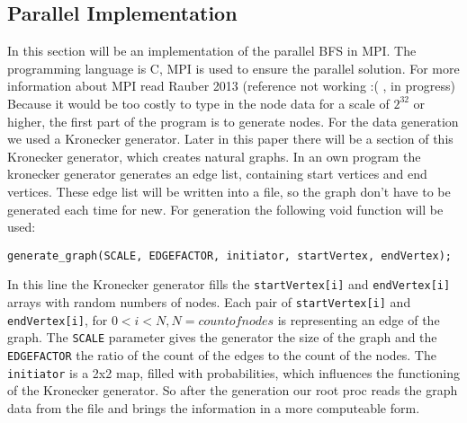 \documentclass[12pt,a4paper]{article}
\begin{document}
\subsection{Parallel Implementation}
\label{sec:parallel-impl}

In this section will be an implementation of the parallel BFS in MPI. The programming language is C, MPI is used to ensure the parallel solution. For more information about MPI read Rauber 2013 (reference not working :( , in progress)\\
Because it would be too costly to type in the node data for a scale of \(2^{32}\) or higher, the first part of the program is to generate nodes. For the data generation we used a Kronecker generator. Later in this paper there will be a section of this Kronecker generator, which creates natural graphs. In an own program the kronecker generator generates an edge list, containing start vertices and end vertices. These edge list will be written into a file, so the graph don't have to be generated each time for new. For generation the following void function will be used:

\begin{lstlisting}
generate_graph(SCALE, EDGEFACTOR, initiator, startVertex, endVertex);
\end{lstlisting}

In this line the Kronecker generator fills the \lstinline{startVertex[i]} and \lstinline{endVertex[i]} arrays with random numbers of nodes. Each pair of \lstinline{startVertex[i]} and \lstinline{endVertex[i]}, for \( 0 < i < N, N = count of nodes \) is representing an edge of the graph. The \lstinline{SCALE} parameter gives the generator the size of the graph and the \lstinline{EDGEFACTOR} the ratio of the count of the edges to the count of the nodes. The \lstinline{initiator} is a 2x2 map, filled with probabilities, which influences the functioning of the Kronecker generator. So after the generation our root proc reads the graph data from the file and brings the information in a more computeable form.
\end{document}
